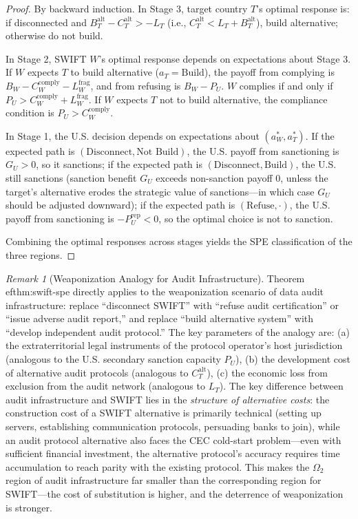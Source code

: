 \documentclass[12pt,a4paper]{ctexart}
\theoremstyle{definition}
\theoremstyle{remark}
\newtheorem{remark}{Remark}[section]
\begin{document}
\begin{proof}
By backward induction. In Stage 3, target country $T$'s optimal response is: if disconnected and $B_T^{\text{alt}} - C_T^{\text{alt}} > -L_T$ (i.e., $C_T^{\text{alt}} < L_T + B_T^{\text{alt}}$), build alternative; otherwise do not build.

In Stage 2, SWIFT $W$'s optimal response depends on expectations about Stage 3. If $W$ expects $T$ to build alternative ($a_T = \text{Build}$), the payoff from complying is $B_W - C_W^{\text{comply}} - L_W^{\text{frag}}$, and from refusing is $B_W - P_U$. $W$ complies if and only if $P_U > C_W^{\text{comply}} + L_W^{\text{frag}}$. If $W$ expects $T$ not to build alternative, the compliance condition is $P_U > C_W^{\text{comply}}$.

In Stage 1, the U.S. decision depends on expectations about $(a_W^*, a_T^*)$. If the expected path is $(\text{Disconnect}, \text{Not Build})$, the U.S. payoff from sanctioning is $G_U > 0$, so it sanctions; if the expected path is $(\text{Disconnect}, \text{Build})$, the U.S. still sanctions (sanction benefit $G_U$ exceeds non-sanction payoff 0, unless the target's alternative erodes the strategic value of sanctions---in which case $G_U$ should be adjusted downward); if the expected path is $(\text{Refuse}, \cdot)$, the U.S. payoff from sanctioning is $-P_U^{\text{rep}} < 0$, so the optimal choice is not to sanction.

Combining the optimal responses across stages yields the SPE classification of the three regions.
\end{proof}

\begin{remark}[Weaponization Analogy for Audit Infrastructure]
Theorem~
ef{thm:swift-spe} directly applies to the weaponization scenario of data audit infrastructure: replace ``disconnect SWIFT'' with ``refuse audit certification'' or ``issue adverse audit report,'' and replace ``build alternative system'' with ``develop independent audit protocol.'' The key parameters of the analogy are: (a) the extraterritorial legal instruments of the protocol operator's host jurisdiction (analogous to the U.S. secondary sanction capacity $P_U$), (b) the development cost of alternative audit protocols (analogous to $C_T^{\text{alt}}$), (c) the economic loss from exclusion from the audit network (analogous to $L_T$). The key difference between audit infrastructure and SWIFT lies in the \textit{structure of alternative costs}: the construction cost of a SWIFT alternative is primarily technical (setting up servers, establishing communication protocols, persuading banks to join), while an audit protocol alternative also faces the CEC cold-start problem---even with sufficient financial investment, the alternative protocol's accuracy requires time accumulation to reach parity with the existing protocol. This makes the $\Omega_2$ region of audit infrastructure far smaller than the corresponding region for SWIFT---the cost of substitution is higher, and the deterrence of weaponization is stronger.
\end{remark}
\end{document}

